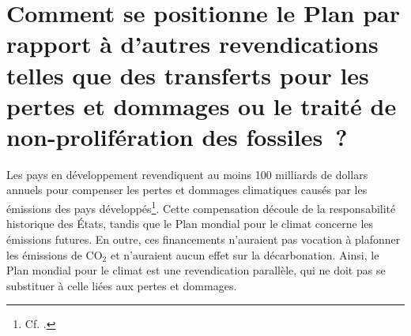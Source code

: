\documentclass[a5paper,french,openany]{memoir}
\begin{document}



\section*{\normalsize Comment se positionne le Plan par rapport à d'autres revendications telles que des transferts pour les pertes et dommages ou le traité de non-prolifération des fossiles~?}\label{q:climate_movt}

Les pays en développement revendiquent au moins 100 milliards de dollars annuels pour compenser les pertes et dommages climatiques causés par les émissions des pays développés\footnote{Cf. \cite{tc_proposal_2023}.}. Cette compensation découle de la responsabilité historique des États, tandis que le Plan mondial pour le climat concerne les émissions futures. En outre, ces financements n'auraient pas vocation à plafonner les émissions de CO$_\text{2}$ et n'auraient aucun effet sur la décarbonation. %
Ainsi, le Plan mondial pour le climat est une revendication parallèle, qui ne doit pas se substituer à celle liées aux pertes et dommages.
\end{document}
